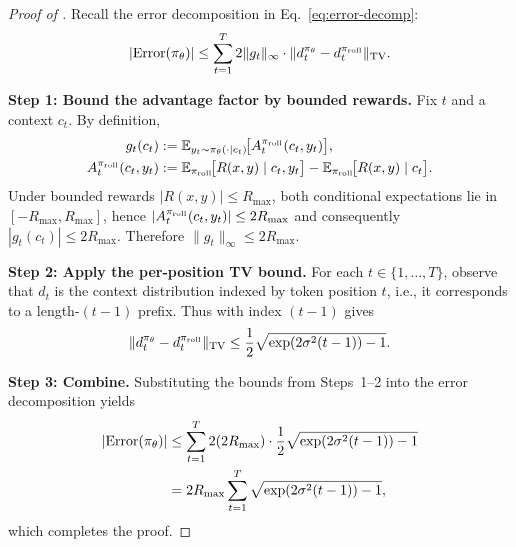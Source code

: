 \begin{proof}[Proof of ]
Recall the error decomposition in Eq.~\eqref{eq:error-decomp}:
\begin{equation*}
    |\mathrm{Error}(\pi_{\theta})|
    \le
    \sum_{t=1}^{T} 2\|g_t\|_\infty \cdot \|d_t^{\pi_{\theta}} - d_t^{\pi_{\mathrm{roll}}}\|_{\mathrm{TV}}.
\end{equation*}

\smallskip
\noindent\textbf{Step 1: Bound the advantage factor by bounded rewards.}
Fix $t$ and a context $c_t$. By definition,
\begin{equation*}
    \begin{aligned}
    g_t(c_t) &:= \mathbb{E}_{y_t \sim \pi_{\theta}(\cdot\mid c_t)}\!\big[A_t^{\pi_{\mathrm{roll}}}(c_t, y_t)\big],\\
    A_t^{\pi_{\mathrm{roll}}}(c_t, y_t)
    &:= \mathbb{E}_{\pi_{\mathrm{roll}}}\!\big[R(x,y)\mid c_t, y_t\big]
       - \mathbb{E}_{\pi_{\mathrm{roll}}}\!\big[R(x,y)\mid c_t\big].
    \end{aligned}
\end{equation*}
Under bounded rewards $|R(x,y)|\le R_{\max}$, both conditional expectations lie in $[-R_{\max},R_{\max}]$, hence
$|A_t^{\pi_{\mathrm{roll}}}(c_t,y_t)|\le 2R_{\max}$ and consequently $|g_t(c_t)|\le 2R_{\max}$. Therefore $\|g_t\|_\infty \le 2R_{\max}$.

\smallskip
\noindent\textbf{Step 2: Apply the per-position TV bound.}
For each $t\in\{1,\ldots,T\}$, observe that $d_t$ is the context distribution indexed by token position $t$, i.e., it corresponds to a length-$(t-1)$ prefix.
Thus  with index $(t-1)$ gives
\begin{equation*}
    \|d_t^{\pi_{\theta}} - d_t^{\pi_{\mathrm{roll}}}\|_{\mathrm{TV}}
    \le
    \frac{1}{2}\sqrt{\exp(2\sigma^2 (t-1)) - 1}.
\end{equation*}

\smallskip
\noindent\textbf{Step 3: Combine.}
Substituting the bounds from Steps~1--2 into the error decomposition yields
\begin{align*}
    |\mathrm{Error}(\pi_{\theta})|
    &\le
    \sum_{t=1}^{T} 2(2R_{\max})\cdot \frac{1}{2}\sqrt{\exp(2\sigma^2 (t-1)) - 1}
    \\
    &=
    2R_{\max}\sum_{t=1}^{T}\sqrt{\exp(2\sigma^2 (t-1)) - 1},
\end{align*}
which completes the proof.
\end{proof}

